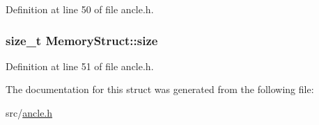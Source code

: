 Definition at line 50 of file ancle.\-h.

\hypertarget{structMemoryStruct_a79d6a7ad34b172f766c19d0846688440}{
\subsubsection[{size}]{\setlength{\rightskip}{0pt plus 5cm}size\-\_\-t Memory\-Struct\-::size}}\label{structMemoryStruct_a79d6a7ad34b172f766c19d0846688440}


Definition at line 51 of file ancle.\-h.



The documentation for this struct was generated from the following file\-:\begin{DoxyCompactItemize}
\item 
src/\hyperlink{ancle_8h}{ancle.\-h}\end{DoxyCompactItemize}
